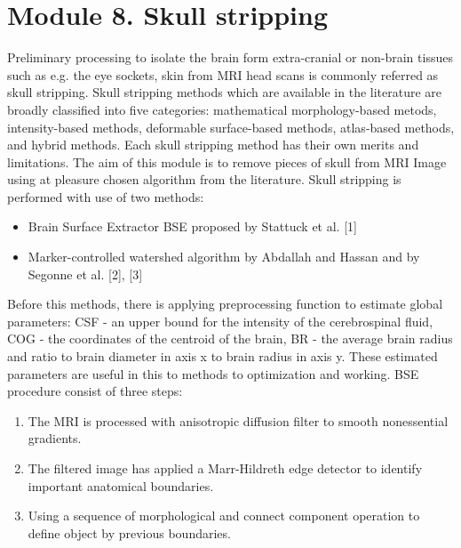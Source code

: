 \section{Module 8. Skull stripping}

Preliminary processing to isolate the brain form extra-cranial or non-brain tissues such as e.g. the eye sockets, skin from MRI head scans is commonly referred as skull stripping. Skull stripping methods which are available in the literature are broadly classified into five categories: mathematical morphology-based metods, intensity-based methods, deformable surface-based methods, atlas-based methods, and hybrid methods. Each skull stripping method has their own merits and limitations.
The aim of this module is to remove pieces of skull from MRI Image using at pleasure chosen algorithm from the literature. Skull stripping is performed with use of two methods:
\begin{itemize}
    \item {Brain Surface Extractor BSE proposed by Stattuck et al. [1]}
    \item {Marker-controlled watershed algorithm by Abdallah and Hassan and by Segonne et al. [2], [3]}
\end{itemize}
Before this methods, there is applying preprocessing function to estimate global parameters: CSF - an upper bound for the intensity of the cerebrospinal fluid, COG - the coordinates of the centroid of the brain, BR - the average brain radius and ratio to brain diameter in axis x to brain radius in axis y. These estimated parameters are useful in this to methods to optimization and working.
BSE procedure consist of three steps:
\begin{enumerate}
\item {The MRI is processed with anisotropic diffusion filter to smooth nonessential gradients.}
\item {The filtered image has applied a Marr-Hildreth edge detector to identify important anatomical boundaries.}
\item {Using a sequence of morphological and connect component operation to define object by previous boundaries.}
\end{enumerate}

